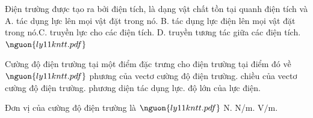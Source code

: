 

\begin{ex}
Điện trường được tạo ra bởi điện tích, là dạng vật chất tồn tại quanh điện tích và A. tác dụng lực lên mọi vật đặt trong nó. B. tác dụng lực điện lên mọi vật đặt trong nó.C. truyền lực cho các điện tích. D. truyền tương tác giữa các điện tích. $\nguon{ly11 kntt.pdf}$
\choiceTF

\end{ex}

\begin{ex}
Cường độ điện trường tại một điểm đặc trưng cho điện trường tại điểm đó về $\nguon{ly11 kntt.pdf}$
\choice
{phương của vectơ cường độ điện trường.}
{chiều của vectơ cường độ điện trường.}
{\True phương diện tác dụng lực.}
{độ lớn của lực điện.}
\end{ex}

\begin{ex}
Đơn vị của cường độ điện trường là $\nguon{ly11 kntt.pdf}$
\choiceTF
{\True N.}
{\True N/m.}
{\True $\mathrm{V/m}.$}
\end{ex}

